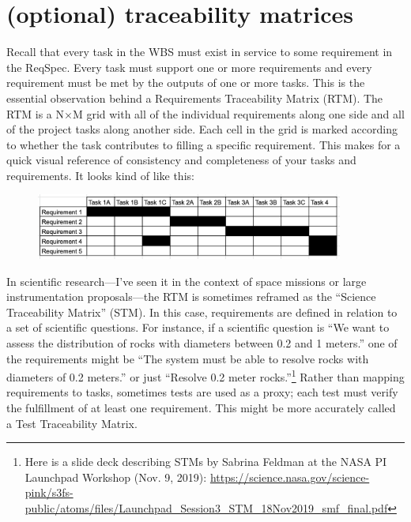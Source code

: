 \documentclass[12pt,oneside]{book}
\begin{document}
\newpage
{}
\section*{(optional) traceability matrices}
\label{scrivauto:33}

Recall that every task in the WBS must exist in service to some requirement in the ReqSpec. Every task must support one or more requirements and every requirement must be met by the outputs of one or more tasks. This is the essential observation behind a Requirements Traceability Matrix (RTM). The RTM is a N$\times$M grid with all of the individual requirements along one side and all of the project tasks along another side. Each cell in the grid is marked according to whether the task contributes to filling a specific requirement. This makes for a quick visual reference of consistency and completeness of your tasks and requirements. It looks kind of like this:

\begin{figure}[h]
\centering
\includegraphics[width=0.9\textwidth]{Task_Matrix_01.png}
\centering
\end{figure}

In scientific research---I've seen it in the context of space missions or large instrumentation proposals---the RTM is sometimes reframed as the ``Science Traceability Matrix'' (STM). In this case, requirements are defined in relation to a set of scientific questions. For instance, if a scientific question is ``We want to assess the distribution of rocks with diameters between 0.2 and 1 meters.'' one of the requirements might be ``The system must be able to resolve rocks with diameters of 0.2 meters.'' or just ``Resolve 0.2 meter rocks.''\footnote{Here is a slide deck describing STMs by Sabrina Feldman at the NASA PI Launchpad Workshop (Nov. 9, 2019): \url{https://science.nasa.gov/science-pink/s3fs-public/atoms/files/Launchpad_Session3_STM_18Nov2019_smf_final.pdf}} Rather than mapping requirements to tasks, sometimes tests are used as a proxy; each test must verify the fulfillment of at least one requirement. This might be more accurately called a Test Traceability Matrix.
\end{document}
